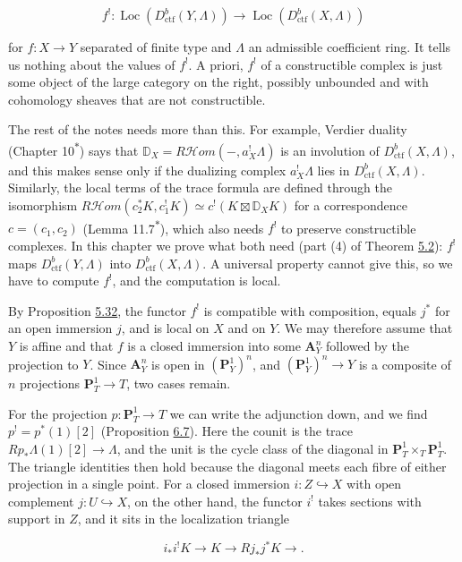 \documentclass[11pt]{article}
\newcommand{\bpout}[1]{#1\textsuperscript{\hyperlink{bp-outside}{\ensuremath{\ast}}}}
\providecommand{\Loc}{}\renewcommand{\Loc}{\operatorname{Loc}}
\providecommand{\cHom}{}\renewcommand{\cHom}{R\mathcal{H}\!om}
\begin{document}
\[
f^!:\Loc(D^b_{\mathrm{ctf}}(Y,\Lambda))\longrightarrow\Loc(D^b_{\mathrm{ctf}}(X,\Lambda))
\]

for \(f:X\to Y\) separated of finite type and \(\Lambda\) an admissible coefficient ring. It tells us nothing about the values of \(f^!\). A priori, \(f^!\) of a constructible complex is just some object of the large category on the right, possibly unbounded and with cohomology sheaves that are not constructible.

The rest of the notes needs more than this. For example, Verdier duality (Chapter \bpout{10}) says that \(\mathbb D_X=\cHom(-,a_X^!\Lambda)\) is an involution of \(D^b_{\mathrm{ctf}}(X,\Lambda)\), and this makes sense only if the dualizing complex \(a_X^!\Lambda\) lies in \(D^b_{\mathrm{ctf}}(X,\Lambda)\). Similarly, the local terms of the trace formula are defined through the isomorphism \(\cHom(c_2^*K,c_1^!K)\simeq c^!(K\boxtimes\mathbb D_XK)\) for a correspondence \(c=(c_1,c_2)\) (Lemma \bpout{11.7}), which also needs \(f^!\) to preserve constructible complexes. In this chapter we prove what both need (part (4) of Theorem \hyperref[bp413]{5.2}): \(f^!\) maps \(D^b_{\mathrm{ctf}}(Y,\Lambda)\) into \(D^b_{\mathrm{ctf}}(X,\Lambda)\). A universal property cannot give this, so we have to compute \(f^!\), and the computation is local.

By Proposition \hyperref[bp510]{5.32}, the functor \(f^!\) is compatible with composition, equals \(j^*\) for an open immersion \(j\), and is local on \(X\) and on \(Y\). We may therefore assume that \(Y\) is affine and that \(f\) is a closed immersion into some \(\mathbf A^n_Y\) followed by the projection to \(Y\). Since \(\mathbf A^n_Y\) is open in \((\mathbf P^1_Y)^n\), and \((\mathbf P^1_Y)^n\to Y\) is a composite of \(n\) projections \(\mathbf P^1_T\to T\), two cases remain.

For the projection \(p:\mathbf P^1_T\to T\) we can write the adjunction down, and we find \(p^!=p^*(1)[2]\) (Proposition \hyperref[bp534]{6.7}). Here the counit is the trace \(Rp_*\Lambda(1)[2]\to\Lambda\), and the unit is the cycle class of the diagonal in \(\mathbf P^1_T\times_T\mathbf P^1_T\). The triangle identities then hold because the diagonal meets each fibre of either projection in a single point. For a closed immersion \(i:Z\hookrightarrow X\) with open complement \(j:U\hookrightarrow X\), on the other hand, the functor \(i^!\) takes sections with support in \(Z\), and it sits in the localization triangle

\[
i_*i^!K\longrightarrow K\longrightarrow Rj_*j^*K\longrightarrow .
\]
\end{document}
